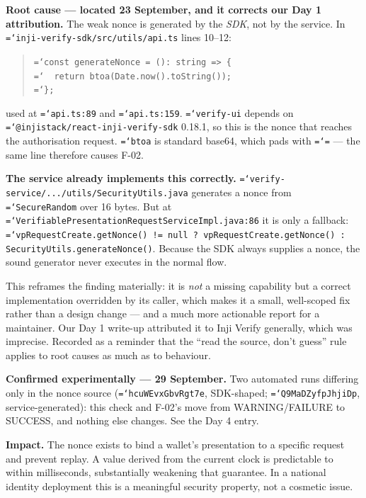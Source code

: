 \documentclass[11pt,a4paper]{article}
\let\origtexttt\texttt
\renewcommand{\texttt}[1]{\origtexttt{\hyphenchar\font=`\-\relax #1}}
\renewcommand{\_}{\textunderscore\allowbreak}
\begin{document}
\textbf{Root cause --- located 23 September, and it corrects our Day 1 attribution.}
The weak nonce is generated by the \emph{SDK}, not by the service. In
\texttt{inji-verify-sdk/src/utils/api.ts} lines 10--12:

\begin{quote}\small
\texttt{const generateNonce = (): string => \{}\\
\texttt{\ \ return btoa(Date.now().toString());}\\
\texttt{\};}
\end{quote}

\noindent used at \texttt{api.ts:89} and \texttt{api.ts:159}. \texttt{verify-ui} depends on
\texttt{@injistack/react-inji-verify-sdk} 0.18.1, so this is the nonce that reaches the
authorisation request. \texttt{btoa} is standard base64, which pads with \texttt{=} ---
the same line therefore causes F-02.

\textbf{The service already implements this correctly.}
\texttt{verify-service/.../utils/SecurityUtils.java} generates a nonce from
\texttt{SecureRandom} over 16 bytes. But at
\texttt{VerifiablePresentationRequestServiceImpl.java:86} it is only a fallback:
\texttt{vpRequestCreate.getNonce() != null ? vpRequestCreate.getNonce() :
SecurityUtils.generateNonce()}. Because the SDK always supplies a nonce, the sound
generator never executes in the normal flow.

This reframes the finding materially: it is \emph{not} a missing capability but a correct
implementation overridden by its caller, which makes it a small, well-scoped fix rather
than a design change --- and a much more actionable report for a maintainer. Our Day 1
write-up attributed it to Inji Verify generally, which was imprecise. Recorded as a
reminder that the ``read the source, don't guess'' rule applies to root causes as much as
to behaviour.

\textbf{Confirmed experimentally --- 29 September.} Two automated runs differing only in
the nonce source (\texttt{hcuWEvxGbvRgt7e}, SDK-shaped; \texttt{Q9MaDZyfpJhjiDp}, service-generated):
this check and F-02's move from WARNING/FAILURE to SUCCESS, and nothing else changes. See
the Day 4 entry.

\textbf{Impact.} The nonce exists to bind a wallet's presentation to a specific request and
prevent replay. A value derived from the current clock is predictable to within milliseconds,
substantially weakening that guarantee. In a national identity deployment this is a
meaningful security property, not a cosmetic issue.
\end{document}

